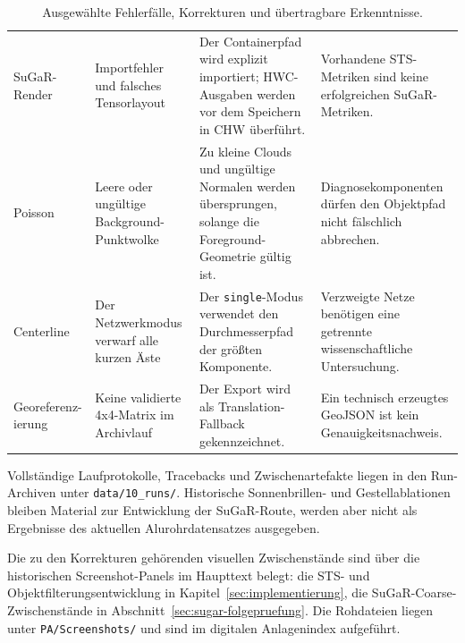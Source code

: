 \begin{table}[H]
\begin{tabularx}{\textwidth}{p{2.6cm}XXX}
SuGaR-Render & Importfehler und falsches Tensorlayout & Der Containerpfad wird
explizit importiert; HWC-Ausgaben werden vor dem Speichern in CHW überführt. &
Vorhandene STS-Metriken sind keine erfolgreichen SuGaR-Metriken.\\
Poisson & Leere oder ungültige Background-Punktwolke & Zu kleine Clouds und
ungültige Normalen werden übersprungen, solange die Foreground-Geometrie gültig
ist. & Diagnosekomponenten dürfen den Objektpfad nicht fälschlich abbrechen.\\
Centerline & Der Netzwerkmodus verwarf alle kurzen Äste & Der
\texttt{single}-Modus verwendet den Durchmesserpfad der größten Komponente. &
Verzweigte Netze benötigen eine getrennte wissenschaftliche Untersuchung.\\
\shortstack{Georeferenz-\\ierung} & Keine validierte 4x4-Matrix im Archivlauf & Der Export wird
als Translation-Fallback gekennzeichnet. & Ein technisch erzeugtes GeoJSON ist
kein Genauigkeitsnachweis.\\
\bottomrule
\end{tabularx}
\caption{Ausgewählte Fehlerfälle, Korrekturen und übertragbare Erkenntnisse.}
\label{tab:fehlerchronik}
\end{table}

Vollständige Laufprotokolle, Tracebacks und Zwischenartefakte liegen in den
Run-Archiven unter \texttt{data/10\_runs/}. Historische Sonnenbrillen- und
Gestellablationen bleiben Material zur Entwicklung der SuGaR-Route, werden aber
nicht als Ergebnisse des aktuellen Alurohrdatensatzes ausgegeben.

Die zu den Korrekturen gehörenden visuellen Zwischenstände sind über die
historischen Screenshot-Panels im Haupttext belegt: die STS- und
Objektfilterungsentwicklung in Kapitel~\ref{sec:implementierung}, die
SuGaR-Coarse-Zwischenstände in Abschnitt~\ref{sec:sugar-folgepruefung}. Die
Rohdateien liegen unter \texttt{PA/Screenshots/} und sind im digitalen
Anlagenindex aufgeführt.

